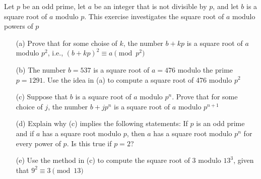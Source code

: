 \begin{exer}[2.24] Let $p$ be an odd prime, let $a$ be an integer that is not divisible by $p$, and let $b$ is a square root of $a$ modulo $p$. This exercise investigates the square root of $a$ modulo powers of $p$

\begin{enumerate}
    \item [(a)] Prove that for some choise of $k$, the number $b+kp$ is a square root of $a$ modulo $p^2$, i.e., $(b+kp)^2 \equiv a \pmod{p^2}$
    \item [(b)] The number $b=537$ is a square root of $a=476$ modulo the prime $p=1291$. Use the idea in (a) to compute a square root of 476 modulo $p^2$
    \item [(c)] Suppose that $b$ is a square root of $a$ modulo $p^n$. Prove that for some choice of $j$, the number $b+jp^n$ is a square root of $a$ modulo $p^{n+1}$
    \item [(d)] Explain why (c) implies the following statements: If $p$ is an odd prime and if $a$ has a square root modulo $p$, then $a$ has a square root modulo $p^n$ for every power of $p$. Is this true if $p=2$?
    \item [(e)] Use the method in (c) to compute the square root of 3 modulo $13^3$, given that $9^2\equiv 3 \pmod{13}$
\end{enumerate}
\end{exer}

